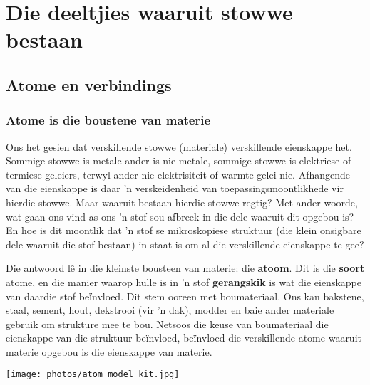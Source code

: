         \chapter{Die deeltjies waaruit stowwe bestaan}
\label{chap:composition}
    \setcounter{figure}{1}
    \setcounter{subfigure}{1}
    \label{m38120}
\section{Atome en verbindings}
    \subsection*{Atome is die boustene van materie}
            \nopagebreak

      \label{m38120*id307092}Ons het gesien dat verskillende stowwe (materiale) verskillende eienskappe het. Sommige stowwe is metale ander is nie-metale, sommige stowwe is elektriese of termiese geleiers, terwyl ander nie elektrisiteit of warmte gelei nie. Afhangende van die eienskappe is daar  'n verskeidenheid van toepassingsmoontlikhede vir hierdie stowwe. Maar waaruit bestaan hierdie stowwe regtig? Met ander woorde, wat gaan ons vind as ons  'n stof sou afbreek in die dele waaruit dit opgebou is? En hoe is dit moontlik dat  'n stof se mikroskopiese struktuur (die klein onsigbare dele waaruit die stof bestaan) in staat is om al die verskillende eienskappe te gee? \par 
\begin{minipage}{.6\textwidth}
      \label{m38120*id307099}
Die antwoord l\^{e} in die kleinste bousteen van materie: die \textbf{atoom}. Dit is die \textbf{soort} atome, en die manier waarop hulle is in  'n stof \textbf{gerangskik} is wat die eienskappe van daardie stof beїnvloed. Dit stem ooreen met boumateriaal. Ons kan bakstene, staal, sement, hout, dekstrooi (vir  'n dak), modder en baie ander materiale gebruik om strukture mee te bou. Netsoos die keuse van boumateriaal die eienskappe van die struktuur beïnvloed, beïnvloed die verskillende atome waaruit materie opgebou is die eienskappe van materie.\par 
\end{minipage}
\begin{minipage}{.4\textwidth}
 \begin{center}
\texttt{[image: photos/atom\_model\_kit.jpg]}
 \end{center}
\end{minipage}

